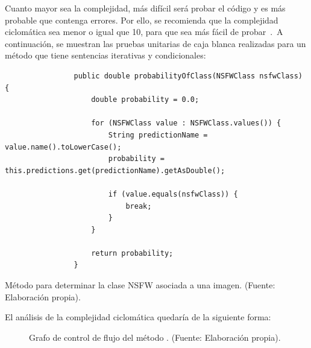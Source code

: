 Cuanto mayor sea la complejidad, más difícil será probar el código y es más probable que contenga errores.
Por ello, se recomienda que la complejidad ciclomática sea menor o igual que 10, para que sea más fácil de
probar~\cite{Cyclomat84:online}.\ A continuación, se muestran las pruebas unitarias de caja blanca
realizadas para un método que tiene sentencias iterativas y condicionales:

\begin{codeBlock}
	\begin{verbatim}
				public double probabilityOfClass(NSFWClass nsfwClass) {
					double probability = 0.0;

					for (NSFWClass value : NSFWClass.values()) {
						String predictionName = value.name().toLowerCase();
						probability = this.predictions.get(predictionName).getAsDouble();

						if (value.equals(nsfwClass)) {
							break;
						}
					}

					return probability;
				}
	\end{verbatim}
	\caption{Método para determinar la clase NSFW asociada a una imagen. (Fuente: Elaboración propia).}
\end{codeBlock}
\label{cod:codigo-pruebas-unitarias-caja-blanca}

El análisis de la complejidad ciclomática quedaría de la siguiente forma:

\begin{figure}[H]
	\centering
	\caption{Grafo de control de flujo del método . (Fuente: Elaboración propia).}
	\label{fig:grafo-control-flujo-pruebas-unitarias-caja-blanca}
\end{figure}

